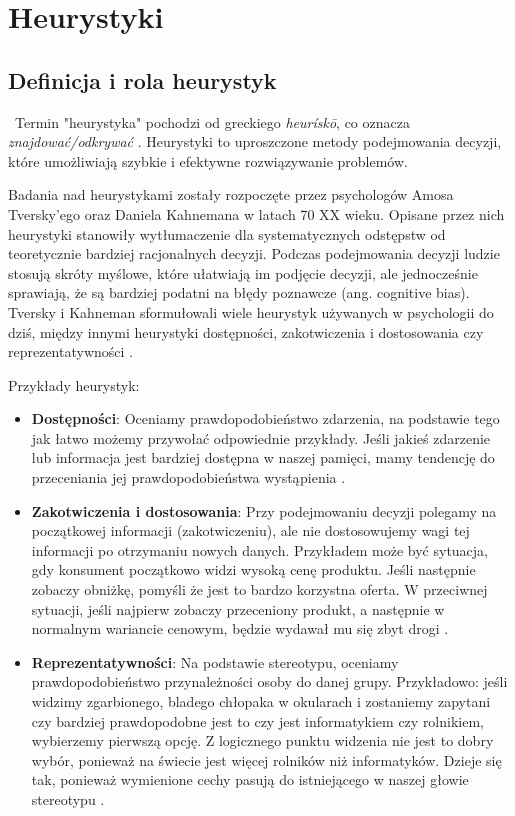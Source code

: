 \newpage %
\section{Heurystyki}

\subsection{Definicja i rola heurystyk}
\indent\ Termin "heurystyka" pochodzi od greckiego \emph{heurískō}, co oznacza \emph{znajdować/odkrywać} \cite{heuristicEtymology}. Heurystyki to uproszczone metody podejmowania decyzji, które umożliwiają szybkie i efektywne rozwiązywanie problemów.

Badania nad heurystykami zostały rozpoczęte przez psychologów Amosa Tversky'ego oraz Daniela Kahnemana w latach 70 XX wieku. Opisane przez nich heurystyki stanowiły wytłumaczenie dla systematycznych odstępstw od teoretycznie bardziej racjonalnych decyzji. Podczas podejmowania decyzji ludzie stosują skróty myślowe, które ułatwiają im podjęcie decyzji, ale jednocześnie sprawiają, że są bardziej podatni na błędy poznawcze (ang. cognitive bias). Tversky i Kahneman sformułowali wiele heurystyk używanych w psychologii do dziś, między innymi heurystyki dostępności, zakotwiczenia i dostosowania czy reprezentatywności \cite{tversky74} \cite{psychol} \cite{laibson}.

Przykłady heurystyk:
\begin{itemize}
    \item{\textbf{Dostępności}}: Oceniamy prawdopodobieństwo zdarzenia, na podstawie tego jak łatwo możemy przywołać odpowiednie przykłady. Jeśli jakieś zdarzenie lub informacja jest bardziej dostępna w naszej pamięci, mamy tendencję do przeceniania jej prawdopodobieństwa wystąpienia \cite{tversky74}.
    \item{\textbf{Zakotwiczenia i dostosowania}}: Przy podejmowaniu decyzji polegamy na początkowej informacji (zakotwiczeniu), ale nie dostosowujemy wagi tej informacji po otrzymaniu nowych danych. Przykładem może być sytuacja, gdy konsument początkowo widzi wysoką cenę produktu. Jeśli następnie zobaczy obniżkę, pomyśli że jest to bardzo korzystna oferta. W przeciwnej sytuacji, jeśli najpierw zobaczy przeceniony produkt, a następnie w normalnym wariancie cenowym, będzie wydawał mu się zbyt drogi \cite{tversky74, pricing}.
    \item{\textbf{Reprezentatywności}}: Na podstawie stereotypu, oceniamy prawdopodobieństwo przynależności osoby do danej grupy. Przykładowo: jeśli widzimy zgarbionego, bladego chłopaka w okularach i zostaniemy zapytani czy bardziej prawdopodobne jest to czy jest informatykiem czy rolnikiem, wybierzemy pierwszą opcję. Z logicznego punktu widzenia nie jest to dobry wybór, ponieważ na świecie jest więcej rolników niż informatyków. Dzieje się tak, ponieważ wymienione cechy pasują do istniejącego w naszej głowie stereotypu \cite{tversky74} \cite{sudeep}.
\end{itemize}

